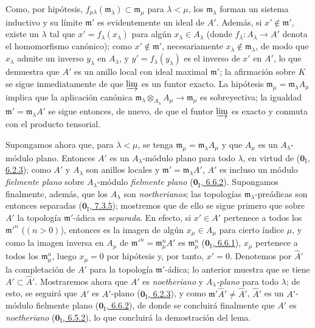 Como, por hipótesis, $f_{\mu\lambda}(\mathfrak m_\lambda)\subset\mathfrak m_\mu$ para $\lambda<\mu$, los $\mathfrak m_\lambda$ forman un sistema inductivo y su límite $\mathfrak m'$ es evidentemente un ideal de $A'$.
Además, si $x'\notin\mathfrak m'$, existe un $\lambda$ tal que $x'=f_\lambda(x_\lambda)$ para algún $x_\lambda\in A_\lambda$ (donde $f_\lambda:A_\lambda\to A'$ denota el homomorfismo canónico);
como $x'\notin\mathfrak m'$, necesariamente $x_\lambda\notin\mathfrak m_\lambda$, de modo que $x_\lambda$ admite un inverso $y_\lambda$ en $A_\lambda$, y $y'=f_\lambda(y_\lambda)$ es el inverso de $x'$ en $A'$, lo que demuestra que $A'$ es un anillo local con ideal maximal $\mathfrak m'$;
la afirmación sobre $K$ se sigue inmediatamente de que $\varinjlim$ es un funtor exacto.
La hipótesis $\mathfrak m_\mu=\mathfrak m_\lambda A_\mu$ implica que la aplicación canónica $\mathfrak m_\lambda\otimes_{A_\lambda}A_\mu\to\mathfrak m_\mu$ es sobreyectiva;
la igualdad $\mathfrak m'=\mathfrak m_\lambda A'$ se sigue entonces, de nuevo, de que el funtor $\varinjlim$ es exacto y conmuta con el producto tensorial.

Supongamos ahora que, para $\lambda<\mu$, se tenga $\mathfrak m_\mu=\mathfrak m_\lambda A_\mu$ y que $A_\mu$ es un $A_\lambda$-módulo plano.
Entonces $A'$ es un $A_\lambda$-módulo plano para todo $\lambda$, en virtud de (\hyperref[0.6.2.3-fr]{$\mathbf{0}_{\mathrm I}$, 6.2.3}); como $A'$ y $A_\lambda$ son anillos locales y $\mathfrak m'=\mathfrak m_\lambda A'$,
$A'$ es incluso un módulo \emph{fielmente plano} sobre $A_\lambda$-módulo \emph{fielmente plano} (\hyperref[0.6.6.2-fr]{$\mathbf{0}_{\mathrm I}$, 6.6.2}). Supongamos finalmente, además, que los $A_\lambda$ son \emph{noetherianos};
las topologías $\mathfrak m_\lambda$-preádicas son entonces separadas (\hyperref[0.7.3.5-fr]{$\mathbf{0}_{\mathrm I}$, 7.3.5}); mostremos que de ello se sigue primero que sobre $A'$ la topología $\mathfrak m'$-ádica es \emph{separada}. En efecto, si $x'\in A'$ pertenece a todos los $\mathfrak m'^{n}$ ($(n>0)$), entonces es la imagen de algún $x_\mu\in A_\mu$ para cierto índice $\mu$, y como la imagen inversa en $A_\mu$ de $\mathfrak m'^{n}=\mathfrak m_\mu^n A'$ es $\mathfrak m_\mu^n$
(\hyperref[0.6.6.1-fr]{$\mathbf{0}_{\mathrm I}$, 6.6.1}), $x_\mu$ pertenece a todos los $\mathfrak m_\mu^n$, luego $x_\mu=0$ por hipótesis y, por tanto, $x'=0$.
Denotemos por $\widehat A'$ la completación de $A'$ para la topología $\mathfrak m'$-ádica;
lo anterior muestra que se tiene $A'\subset\widehat A'$.
Mostraremos ahora que $\widehat A'$ es \emph{noetheriano} y \emph{$A_\lambda$-plano} para todo $\lambda$;
de esto,
se seguirá que $\widehat A'$ es $A'$-plano (\hyperref[0.6.2.3-fr]{$\mathbf{0}_{\mathrm I}$, 6.2.3}), y como $\mathfrak m'\widehat A'\ne\widehat A'$,
$\widehat A'$ es un $A'$-módulo fielmente plano (\hyperref[0.6.6.2-fr]{$\mathbf{0}_{\mathrm I}$, 6.6.2}), de donde se concluirá finalmente que $A'$ es \emph{noetheriano} (\hyperref[0.6.5.2-fr]{$\mathbf{0}_{\mathrm I}$, 6.5.2}), lo que concluirá la demostración del lema.

